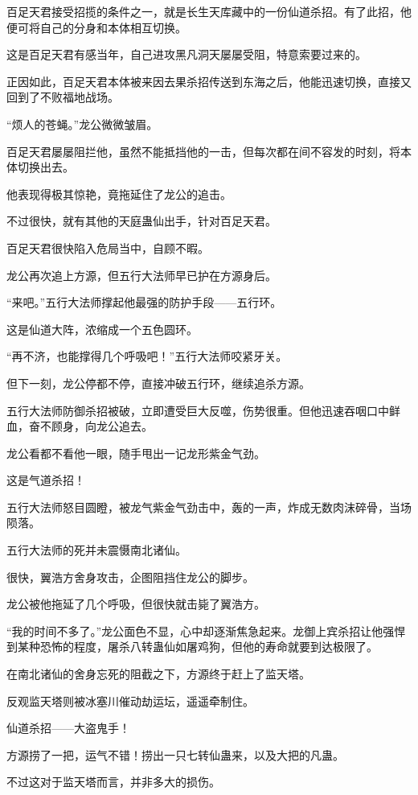 \begin{this_body}
百足天君接受招揽的条件之一，就是长生天库藏中的一份仙道杀招。有了此招，他便可将自己的分身和本体相互切换。

这是百足天君有感当年，自己进攻黑凡洞天屡屡受阻，特意索要过来的。

正因如此，百足天君本体被来因去果杀招传送到东海之后，他能迅速切换，直接又回到了不败福地战场。

“烦人的苍蝇。”龙公微微皱眉。

百足天君屡屡阻拦他，虽然不能抵挡他的一击，但每次都在间不容发的时刻，将本体切换出去。

他表现得极其惊艳，竟拖延住了龙公的追击。

不过很快，就有其他的天庭蛊仙出手，针对百足天君。

百足天君很快陷入危局当中，自顾不暇。

龙公再次追上方源，但五行大法师早已护在方源身后。

“来吧。”五行大法师撑起他最强的防护手段——五行环。

这是仙道大阵，浓缩成一个五色圆环。

“再不济，也能撑得几个呼吸吧！”五行大法师咬紧牙关。

但下一刻，龙公停都不停，直接冲破五行环，继续追杀方源。

五行大法师防御杀招被破，立即遭受巨大反噬，伤势很重。但他迅速吞咽口中鲜血，奋不顾身，向龙公追去。

龙公看都不看他一眼，随手甩出一记龙形紫金气劲。

这是气道杀招！

五行大法师怒目圆瞪，被龙气紫金气劲击中，轰的一声，炸成无数肉沫碎骨，当场陨落。

五行大法师的死并未震慑南北诸仙。

很快，翼浩方舍身攻击，企图阻挡住龙公的脚步。

龙公被他拖延了几个呼吸，但很快就击毙了翼浩方。

“我的时间不多了。”龙公面色不显，心中却逐渐焦急起来。龙御上宾杀招让他强悍到某种恐怖的程度，屠杀八转蛊仙如屠鸡狗，但他的寿命就要到达极限了。

在南北诸仙的舍身忘死的阻截之下，方源终于赶上了监天塔。

反观监天塔则被冰塞川催动劫运坛，遥遥牵制住。

仙道杀招——大盗鬼手！

方源捞了一把，运气不错！捞出一只七转仙蛊来，以及大把的凡蛊。

不过这对于监天塔而言，并非多大的损伤。


\end{this_body}
